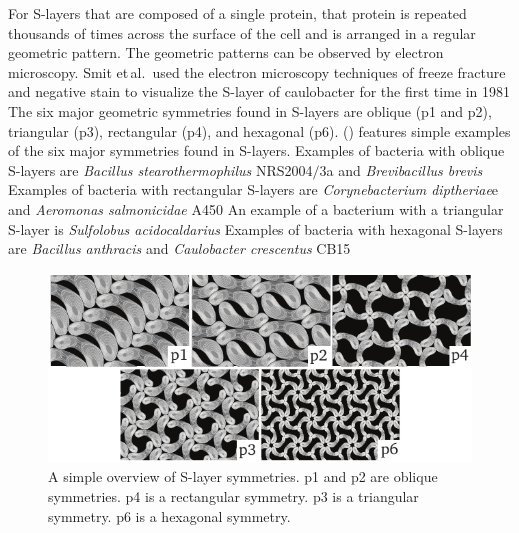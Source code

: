 For \acp{S-layer} that are composed of a single protein, that protein is repeated thousands of times
across the surface of the cell and is arranged in a regular geometric pattern. The geometric
patterns can be observed by electron microscopy. Smit et\,al.~used the electron microscopy techniques
of freeze fracture and negative stain to visualize the \ac{S-layer} of \ac{caulobacter} for the
first time in 1981 The six major geometric symmetries found in
\acp{S-layer} are oblique (p1 and p2), triangular (p3), rectangular (p4), and hexagonal
(p6).  () features simple examples of the six major
symmetries found in \acp{S-layer}.  Examples of bacteria with oblique \acp{S-layer} are
\textit{Bacillus stearothermophilus} NRS2004$/$3a and
\textit{Brevibacillus brevis} Examples of bacteria with rectangular
\acp{S-layer} are \textit{Corynebacterium diptheriae}e and
\textit{Aeromonas salmonicidae} A450 An example of a bacterium with a
triangular \ac{S-layer} is \textit{Sulfolobus acidocaldarius} Examples
of bacteria with hexagonal \acp{S-layer} are \textit{Bacillus anthracis}
and \textit{Caulobacter crescentus} CB15

\begin{figure}[htb] %
  \begin{center}
    \includegraphics[]{intro/img/symmetries.pdf}
  \end{center}
  \caption[A simple overview of \ac{S-layer} symmetries]{A simple overview of \ac{S-layer}
    symmetries. p1 and p2 are oblique symmetries.  p4 is a rectangular symmetry.  p3 is a triangular
    symmetry.  p6 is a hexagonal symmetry.}
  \label{fig:symmetries}
\end{figure}
   
